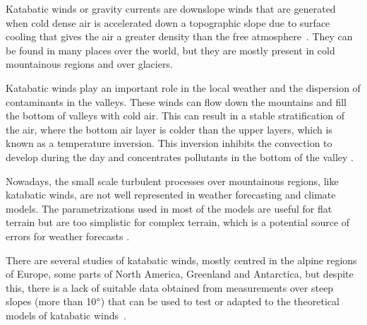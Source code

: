 Katabatic winds or gravity currents are downslope winds that are generated when cold dense air is accelerated down a topographic slope due to surface cooling that gives the air a greater density than the free atmosphere~\citep{poulos2008observational}. They can be found in many places over the world, but they are mostly present in cold mountainous regions and over glaciers. 

Katabatic winds play an important role in the local weather and the dispersion of contaminants in the valleys. These winds can flow down the mountains and fill the bottom of valleys with cold air. This can result in a stable stratification of the air, where the bottom air layer is colder than the upper layers, which is known as a  temperature inversion. This inversion inhibits the convection to develop during the day and concentrates pollutants in the bottom of the valley \citep{largeron2016persistent}.

Nowadays, the small scale turbulent processes over mountainous regions, like katabatic winds, are not well represented in weather forecasting and climate models. The parametrizations used in most of the models are useful for flat terrain but are too simplistic for complex terrain, which is a potential source of errors for weather forecasts \citep{serafin2018exchange}. 

There are several studies of katabatic winds, mostly centred in the alpine regions of Europe, some parts of North America, Greenland and Antarctica, but despite this, there is a lack of suitable data obtained from measurements over steep slopes (more than 10$\degree$) that can be used to test or adapted to the theoretical models of katabatic winds~\citep{manins1979katabatic}. 


